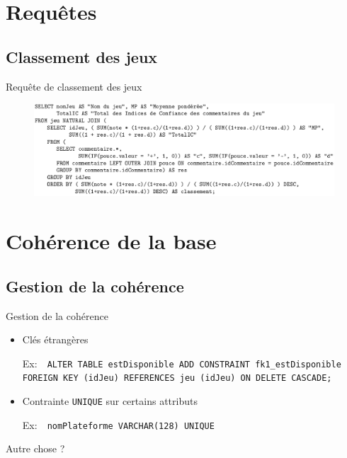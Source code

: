 \documentclass{beamer}
\begin{document}
\section{Requêtes}
\subsection{Classement des jeux}
\begin{frame}
\begin{block}{Requête de classement des jeux}
\begin{center}
\begin{figure}[t]
  \includegraphics[scale=0.3]{requete.png}
\end{figure}
\end{center}
\end{block}
\end{frame}


\section{Cohérence de la base}
\subsection{Gestion de la cohérence}
\begin{frame}
\begin{block}{Gestion de la cohérence}
\begin{itemize}
  \item Clés étrangères \\
    \begin{center}\footnotesize{Ex:~~\texttt{ALTER TABLE estDisponible ADD CONSTRAINT fk1\_estDisponible FOREIGN KEY (idJeu) REFERENCES jeu (idJeu) ON DELETE CASCADE;}}\end{center}
  \item Contrainte \texttt{UNIQUE} sur certains attributs\\
    \begin{center}\footnotesize{Ex:~~\texttt{nomPlateforme VARCHAR(128) UNIQUE}}\end{center}
\end{itemize}
\huge{ Autre chose ?}

\end{block}
\end{frame}
\end{document}
